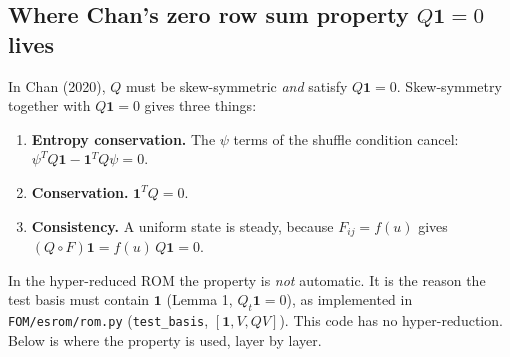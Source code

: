 \documentclass[11pt,a4paper]{article}
\newcommand{\code}[1]{\texttt{\small #1}}
\begin{document}
\subsection{Where Chan's zero row sum property $Q\mathbf 1=0$ lives}\label{sec:rowsum}
In Chan (2020), $Q$ must be skew-symmetric \emph{and} satisfy $Q\mathbf 1=0$. Skew-symmetry together with $Q\mathbf 1=0$ gives three things:
\begin{enumerate}
\item[(a)] \textbf{Entropy conservation.} The $\psi$ terms of the shuffle condition cancel: $\psi^TQ\mathbf 1-\mathbf 1^TQ\psi=0$.
\item[(b)] \textbf{Conservation.} $\mathbf 1^TQ=0$.
\item[(c)] \textbf{Consistency.} A uniform state is steady, because $F_{ij}=f(u)$ gives $(Q\circ F)\mathbf 1=f(u)\,Q\mathbf 1=0$.
\end{enumerate}
In the hyper-reduced ROM the property is \emph{not} automatic. It is the reason the test basis must contain $\mathbf 1$ (Lemma 1, $Q_t\mathbf 1=0$), as implemented in \code{FOM/esrom/rom.py} (\code{test\_basis}, $[\mathbf 1,V,QV]$). This code has no hyper-reduction. Below is where the property is used, layer by layer.
\end{document}
